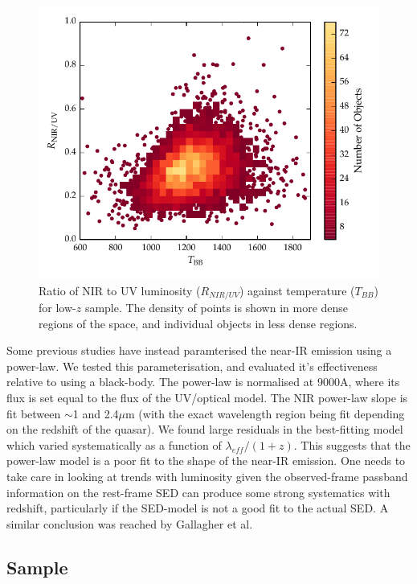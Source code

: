 \begin{figure}
  \centering
  \includegraphics[width=\textwidth]{figures/chapter06/ratio_tbb_density.pdf}
  \caption{Ratio of NIR to UV luminosity ($R_{NIR/UV}$) against temperature ($T_{BB}$) for low-$z$ sample. The density of points is shown in more dense regions of the space, and individual objects in less dense regions. }
  \label{fig:ratio_tbb_density}
\end{figure}

Some previous studies \citep[e.g.][]{wang13,zhang14} have instead paramterised the near-IR emission using a power-law. 
We tested this parameterisation, and evaluated it's effectiveness relative to using a black-body. 
The power-law is normalised at 9000A, where its flux is set equal to the flux of the UV/optical model. 
The NIR power-law slope is fit between $\sim$1 and 2.4$\mu$m (with the exact wavelength region being fit depending on the redshift of the quasar). 
We found large residuals in the best-fitting model which varied systematically as a function of $\lambda_{eff}/(1+z)$.  
This suggests that the power-law model is a poor fit to the shape of the near-IR emission. 
One needs to take care in looking at trends with luminosity given the observed-frame passband information on the rest-frame SED can produce some strong systematics with redshift, particularly if the SED-model is not a good fit to the actual SED. 
A similar conclusion was reached by Gallagher et al.

\subsection{Sample}


